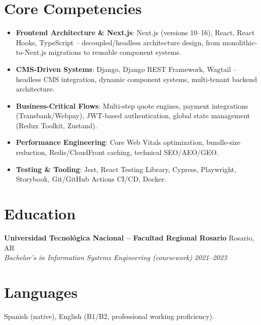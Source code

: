 \documentclass[10.5pt,a4paper]{article}
\newcommand{\cvheaderline}[2]{\textbf{#1} \hfill #2\\}
\newcommand{\cvsubheaderline}[2]{\textit{#1} \hfill \textit{#2}\\[1pt]}
\begin{document}
\section{Core Competencies}
\begin{itemize}

\item \textbf{Frontend Architecture \& Next.js}: Next.js (versions 10--16), React, React Hooks, TypeScript -- decoupled/headless architecture design, from monolithic-to-Next.js migrations to reusable component systems.

\item \textbf{CMS-Driven Systems}: Django, Django REST Framework, Wagtail -- headless CMS integration, dynamic component systems, multi-tenant backend architecture.

\item \textbf{Business-Critical Flows}: Multi-step quote engines, payment integrations (Transbank/Webpay), JWT-based authentication, global state management (Redux Toolkit, Zustand).

\item \textbf{Performance Engineering}: Core Web Vitals optimization, bundle-size reduction, Redis/CloudFront caching, technical SEO/AEO/GEO.

\item \textbf{Testing \& Tooling}: Jest, React Testing Library, Cypress, Playwright, Storybook, Git/GitHub Actions CI/CD, Docker.

\end{itemize}

\section{Education}
\cvheaderline{Universidad Tecnológica Nacional -- Facultad Regional Rosario}{Rosario, AR}
\cvsubheaderline{Bachelor's in Information Systems Engineering (coursework)}{2021--2023}

\section{Languages}
\noindent Spanish (native), English (B1/B2, professional working proficiency).
\end{document}
